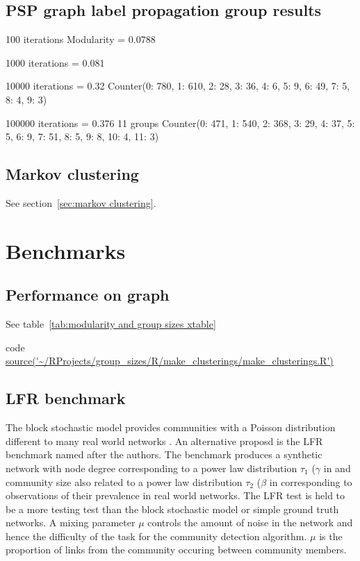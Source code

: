 \subsection{PSP graph label propagation group results}
100 iterations Modularity = 0.0788

1000 iterations = 0.081

10000 iterations = 0.32
Counter({0: 780, 1: 610, 2: 28, 3: 36, 4: 6, 5: 9, 6: 49, 7: 5, 8: 4, 9: 3})

100000 iterations = 0.376 11 groups
Counter({0: 471,
         1: 540,
         2: 368,
         3: 29,
         4: 37,
         5: 5,
         6: 9,
         7: 51,
         8: 5,
         9: 8,
         10: 4,
         11: 3})
 



\subsection{Markov clustering}
See section~\ref{sec:markov clustering}.


\section{Benchmarks}

\subsection{Performance on graph}
See table~\ref{tab:modularity and group sizes xtable} 

code \url{source('~/RProjects/group_sizes/R/make_clusterings/make_clusterings.R')}


\subsection{LFR benchmark}

The block stochastic model provides communities with a Poisson distribution different to many real world networks . An alternative proposd is the LFR benchmark named after the authors. The benchmark produces a synthetic network with node degree corresponding to a power law distribution $\tau_1$ ($\gamma$ in \cite{lancichinetti2009community} and community size also related to a power law distribution $\tau_2$ ($\beta$ in \cite{lancichinetti2009community} corresponding to observations of their prevalence in real world networks. The LFR test is held to be a more testing test than the block stochastic model or simple ground truth networks. A mixing parameter $\mu$ controls the amount of noise in the network and hence the difficulty of the task for the community detection algorithm. $\mu$ is the proportion of links from the community occuring between community members. 

